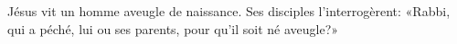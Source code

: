 \encetemps Jésus vit un homme aveugle de naissance.
Ses disciples l’interrogèrent:
	«Rabbi, qui a péché, lui ou ses parents, pour qu’il soit né aveugle?»
